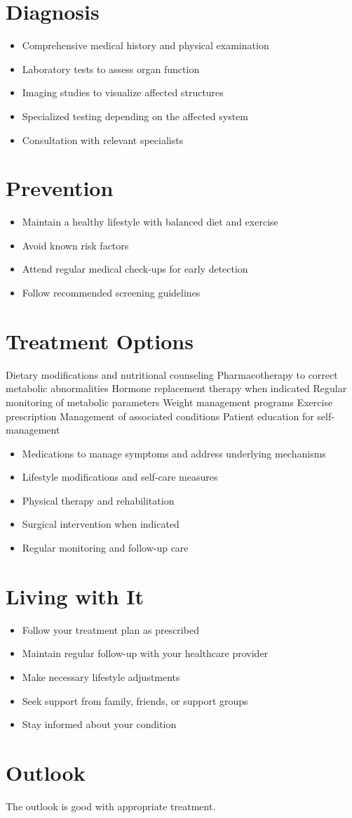 \section{Diagnosis}
\begin{itemize}[noitemsep]
  \item Comprehensive medical history and physical examination
  \item Laboratory tests to assess organ function
  \item Imaging studies to visualize affected structures
  \item Specialized testing depending on the affected system
  \item Consultation with relevant specialists
\end{itemize}
\section{Prevention}
\begin{itemize}[noitemsep]
  \item Maintain a healthy lifestyle with balanced diet and exercise
  \item Avoid known risk factors
  \item Attend regular medical check-ups for early detection
  \item Follow recommended screening guidelines
\end{itemize}
\section{Treatment Options}
Dietary modifications and nutritional counseling Pharmacotherapy to correct metabolic abnormalities Hormone replacement therapy when indicated Regular monitoring of metabolic parameters Weight management programs Exercise prescription Management of associated conditions Patient education for self-management

\begin{itemize}[noitemsep]
  \item Medications to manage symptoms and address underlying mechanisms
  \item Lifestyle modifications and self-care measures
  \item Physical therapy and rehabilitation
  \item Surgical intervention when indicated
  \item Regular monitoring and follow-up care
\end{itemize}
\section{Living with It}
\begin{itemize}[noitemsep]
  \item Follow your treatment plan as prescribed
  \item Maintain regular follow-up with your healthcare provider
  \item Make necessary lifestyle adjustments
  \item Seek support from family, friends, or support groups
  \item Stay informed about your condition
\end{itemize}
\section{Outlook}
The outlook is good with appropriate treatment.
